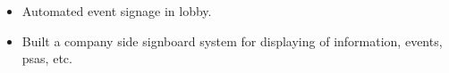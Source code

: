 \begin{itemize}
  \item Automated event signage in lobby.
  \item Built a company side signboard system for displaying of information, events, psas, etc.
\end{itemize}
\vspace{4pt}
